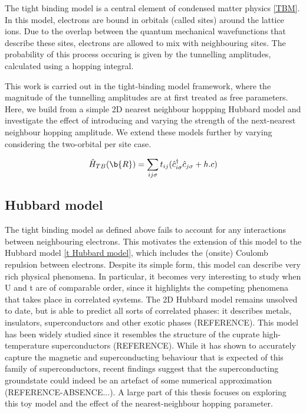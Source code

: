 \documentclass[12pt]{article}
\begin{document}
The tight binding model is a central element of condensed matter physics \eqref{TBM}. In this model, electrons are bound in orbitals (called sites) around the lattice ions.
Due to the overlap between the quantum mechanical wavefunctions that describe these sites, electrons are allowed to mix with neighbouring sites. The probability of this process occuring is given by the tunnelling amplitudes, calculated using a hopping integral. \par
\medskip
\noindent This work is carried out in the tight-binding model framework, where the magnitude of the tunnelling amplitudes are at first treated as free parameters. 
Here, we build from a simple 2D nearest neighbour hoppping Hubbard model and investigate the effect of introducing and varying the strength of the next-nearest neighbour hopping amplitude.
We extend these models further by varying considering the two-orbital per site case. 



\begin{equation} \label{TBM}
    \hat{H}_{TB}(\b{R}) = \sum_{ij\sigma} t_{ij}(\hat{c}_{i\sigma}^{\dagger}\hat{c}_{j \sigma} + h.c)
\end{equation}


\subsection{Hubbard model}

The  tight binding model as defined above fails to account for any interactions between neighbouring electrons. This motivates the extension of this model to the Hubbard model \eqref{t Hubbard model}, which includes the (onsite) Coulomb repulsion between electrons. Despite its simple form, this model can describe very rich physical phenomena.
In particular, it becomes very interesting to study when U and t are of comparable order, since it highlights the competing phenomena that takes place in correlated systems. 
The 2D Hubbard model remains unsolved to date, but is able to predict all sorts of correlated phases: it describes metals, insulators, superconductors and other exotic phases (REFERENCE). 
This model has been widely studied since it resembles the structure of the cuprate high-temperature superconductors (REFERENCE). While it has shown to accurately  capture the magnetic and superconducting behaviour that is expected of this family of superconductors, recent findings suggest that the superconducting groundstate 
could indeed be an artefact of some numerical approximation (REFERENCE-ABSENCE...). A large part of this thesis focuses on exploring this toy model and the effect of the nearest-neighbour hopping parameter.
\end{document}
